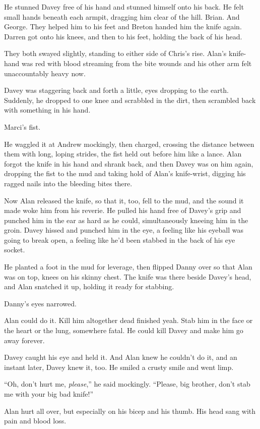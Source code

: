 \documentclass{article}
\begin{document}
He stunned Davey free of his hand and stunned himself onto his back. 
He felt small hands beneath each armpit, dragging him clear of the
hill.  Brian.  And George.  They helped him to his feet and Breton
handed him the knife again.  Darren got onto his knees, and then to
his feet, holding the back of his head.

They both swayed slightly, standing to either side of Chris's rise. 
Alan's knife-hand was red with blood streaming from the bite wounds
and his other arm felt unaccountably heavy now.

Davey was staggering back and forth a little, eyes dropping to the
earth.  Suddenly, he dropped to one knee and scrabbled in the dirt,
then scrambled back with something in his hand.

Marci's fist.

He waggled it at Andrew mockingly, then charged, crossing the distance
between them with long, loping strides, the fist held out before him
like a lance.  Alan forgot the knife in his hand and shrank back, and
then Davey was on him again, dropping the fist to the mud and taking
hold of Alan's knife-wrist, digging his ragged nails into the bleeding
bites there.

Now Alan released the knife, so that it, too, fell to the mud, and the
sound it made woke him from his reverie.  He pulled his hand free of
Davey's grip and punched him in the ear as hard as he could,
simultaneously kneeing him in the groin.  Davey hissed and punched him
in the eye, a feeling like his eyeball was going to break open, a
feeling like he'd been stabbed in the back of his eye socket.

He planted a foot in the mud for leverage, then flipped Danny over so
that Alan was on top, knees on his skinny chest.  The knife was there
beside Davey's head, and Alan snatched it up, holding it ready for
stabbing.

Danny's eyes narrowed.

Alan could do it.  Kill him altogether dead finished yeah.  Stab him
in the face or the heart or the lung, somewhere fatal.  He could kill
Davey and make him go away forever.

Davey caught his eye and held it.  And Alan knew he couldn't do it,
and an instant later, Davey knew it, too.  He smiled a crusty smile
and went limp.

``Oh, don't hurt me, \textit{please},'' he said mockingly.  ``Please,
big brother, don't stab me with your big bad knife!''

Alan hurt all over, but especially on his bicep and his thumb.  His
head sang with pain and blood loss.
\end{document}
